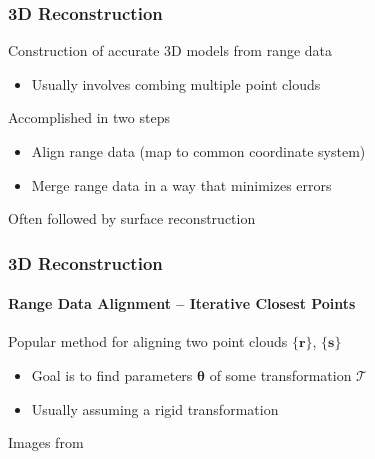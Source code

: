 \documentclass[xetex,professionalfont]{beamer}
\renewcommand{\vec}[1]{\ensuremath{\mathbf{#1}}}
\newcommand{\vr}{\vec{r}}
\newcommand{\vs}{\vec{s}}
\newcommand{\bth}{\boldsymbol{\theta}}
\newcommand{\trans}{\mathcal{T}}
\begin{document}

\begin{frame}
\frametitle{3D Reconstruction}

Construction of accurate 3D models from range data
\begin{itemize}
	\item Usually involves combing multiple point clouds %
\end{itemize}

\bigskip
Accomplished in two steps %
\begin{itemize}
	\item Align range data (map to common coordinate system)
	\item Merge range data in a way that minimizes errors %
\end{itemize}

\bigskip
Often followed by surface reconstruction %

\end{frame}


\begin{frame}
\frametitle{3D Reconstruction}
\framesubtitle{Range Data Alignment -- Iterative Closest Points}

Popular method for aligning two point clouds $\{\vr\}$, $\{\vs\}$
\begin{itemize}
	\item Goal is to find parameters $\bth$ of some transformation $\trans$ %
	\item Usually assuming a rigid transformation %
\end{itemize}

\bigskip
\begin{center}
    {\centering Images from \cite{aiger2008}}
\end{center}

\end{frame}
\end{document}
